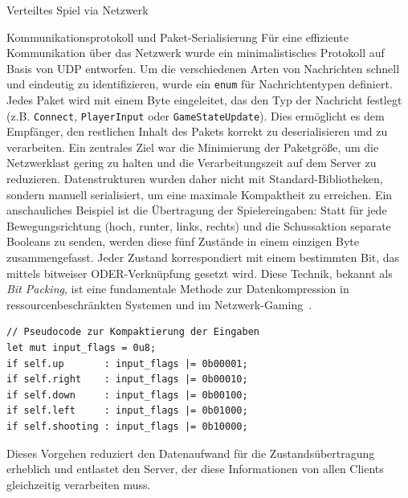 \begin{section}{Verteiltes Spiel via Netzwerk}
\begin{subsection}{Kommunikationsprotokoll und Paket-Serialisierung}
Für eine effiziente Kommunikation über das Netzwerk wurde ein minimalistisches Protokoll auf Basis von UDP entworfen.
Um die verschiedenen Arten von Nachrichten schnell und eindeutig zu identifizieren, wurde ein \texttt{enum} für Nachrichtentypen definiert.
Jedes Paket wird mit einem Byte eingeleitet, das den Typ der Nachricht festlegt (z.B. \texttt{Connect}, \texttt{PlayerInput} oder \texttt{GameStateUpdate}).
Dies ermöglicht es dem Empfänger, den restlichen Inhalt des Pakets korrekt zu deserialisieren und zu verarbeiten.
Ein zentrales Ziel war die Minimierung der Paketgröße, um die Netzwerklast gering zu halten und die Verarbeitungszeit auf dem Server zu reduzieren.
Datenstrukturen wurden daher nicht mit Standard-Bibliotheken, sondern manuell serialisiert, um eine maximale Kompaktheit zu erreichen.
Ein anschauliches Beispiel ist die Übertragung der Spielereingaben:
Statt für jede Bewegungsrichtung (hoch, runter, links, rechts) und die Schussaktion separate Booleans zu senden, werden diese fünf Zustände in einem einzigen Byte zusammengefasst.
Jeder Zustand korrespondiert mit einem bestimmten Bit, das mittels bitweiser ODER-Verknüpfung gesetzt wird. Diese Technik, bekannt als \emph{Bit Packing}, ist eine fundamentale Methode zur Datenkompression in ressourcenbeschränkten Systemen und im Netzwerk-Gaming~\cite{kinematicsoup2016bitpacking}.
\begin{verbatim}
// Pseudocode zur Kompaktierung der Eingaben
let mut input_flags = 0u8;
if self.up       : input_flags |= 0b00001;
if self.right    : input_flags |= 0b00010;
if self.down     : input_flags |= 0b00100;
if self.left     : input_flags |= 0b01000;
if self.shooting : input_flags |= 0b10000;
\end{verbatim}
Dieses Vorgehen reduziert den Datenaufwand für die Zustandsübertragung erheblich und entlastet den Server, der diese Informationen von allen Clients gleichzeitig verarbeiten muss.
\end{subsection}


\end{section}
